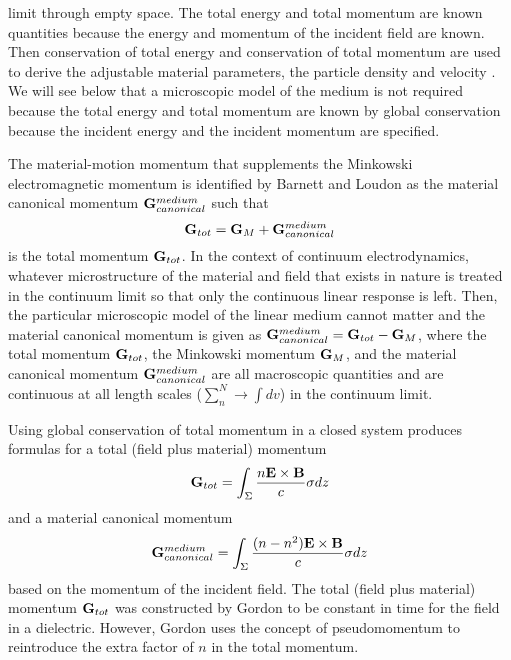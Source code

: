 \documentclass[twocolumn,amssymb,eqsecnum,aps,pra]{revtex4-2}
\begin{document}
limit through empty space.
The total energy and total momentum are known quantities because the
energy and momentum of the incident field are known.
Then conservation of total energy and conservation of total momentum
are used to derive the adjustable material parameters, the particle
density and velocity \cite{BIPfei}.
We will see below that a microscopic model of the medium is not
required because the total energy and total momentum are known
by global conservation because the incident energy and the
incident momentum are specified.
\par
The material-motion momentum that supplements the Minkowski
electromagnetic momentum is identified by
Barnett and Loudon \cite{BIBarnLou} as the material canonical
momentum ${\bf G}^{medium}_{canonical}$ such that
\begin{equation}
{\bf G}_{tot}=
{\bf G}_M+
{\bf G}^{medium}_{canonical} 
\label{EQq2.22}
\end{equation}
is the total momentum ${\bf G}_{tot}$.
In the context of continuum electrodynamics, whatever microstructure
of the material and field that exists in nature is treated in the
continuum limit so that only the continuous linear response is left.
Then, the particular microscopic model of the linear medium cannot
matter and the material canonical momentum is given as
${\bf G}^{medium}_{canonical}={\bf G}_{tot}-{\bf G}_M$,
where the total momentum ${\bf G}_{tot}$, the Minkowski momentum
${\bf G}_M$, and the material canonical momentum
${\bf G}^{medium}_{canonical}$ are all macroscopic quantities
and are continuous at all length scales ($\sum_n^N \rightarrow \int dv$)
in the continuum limit.
\par
Using global conservation of total momentum in a closed
system produces formulas for a total (field plus material)
momentum \cite{BIGord}
\begin{equation}
{\bf G}_{tot}=\int_{\Sigma} \frac{n{\bf E}\times{\bf B}}{c}
\sigma dz 
\label{EQq2.23}
\end{equation}
and a material canonical momentum
\begin{equation}
{\bf G}^{medium}_{canonical}=
\int_{\Sigma} \frac{(n-n^2){\bf E}\times{\bf B}}{c}
\sigma dz 
\label{EQq2.24}
\end{equation}
based on the momentum of the incident field.
The total (field plus material) momentum ${\bf G}_{tot}$ was
constructed by Gordon \cite{BIGord} to be constant in time for
the field in a dielectric.
However, Gordon uses the concept of pseudomomentum to reintroduce
the extra factor of $n$ in the total momentum.
\end{document}
